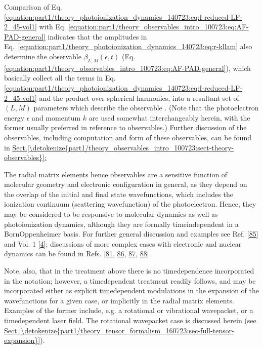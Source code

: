 \documentclass[letterpaper,table,10pt,english]{jupyterBook}
\begin{document}
\sphinxAtStartPar
Comparison of Eq. \eqref{equation:part1/theory_photoionization_dynamics_140723:eq:I-reduced-LF-2_45-vol1} with Eq. \eqref{equation:part1/theory_observables_intro_100723:eq:AF-PAD-general} indicates that the amplitudes
in Eq. \eqref{equation:part1/theory_photoionization_dynamics_140723:eq:r-kllam} also determine the observable {\hyperref[\detokenize{backmatter/glossary:term-anisotropy-paramters}]{}} \(\beta_{L,M}(\epsilon,t)\) (Eq.
\eqref{equation:part1/theory_observables_intro_100723:eq:AF-PAD-general}), which basically collect all the terms in Eq. \eqref{equation:part1/theory_photoionization_dynamics_140723:eq:I-reduced-LF-2_45-vol1} and the product over spherical harmonics, into a resultant set of \((L,M)\) parameters which describe the observable {\hyperref[\detokenize{backmatter/glossary:term-PADs}]{}}. (Note that the photoelectron energy
\(\epsilon\) and momentum \(k\) are used somewhat interchangeably herein,
with the former usually preferred in reference to observables.) Further discussion of the observables, including computation and form of these observables, can be found in \hyperref[\detokenize{part1/theory_observables_intro_100723:sect-theory-observables}]{Sect.\@ \ref{\detokenize{part1/theory_observables_intro_100723:sect-theory-observables}}:}

\sphinxAtStartPar
The radial matrix elements \sphinxhyphen{} hence observables \sphinxhyphen{} are
a sensitive function of molecular geometry and electronic configuration
in general, as they depend on the overlap of the initial and final state wavefunctions, which includes the ionization continuum (scattering wavefunction) of the photoelectron.
Hence, they may be considered to be responsive to molecular
dynamics as well as photoionization dynamics, although they are formally time\sphinxhyphen{}independent in a
Born\sphinxhyphen{}Oppenheimer basis. For further general discussion and examples see
Ref. {[}\hyperlink{cite.backmatter/bibliography:id972}{85}{]} and  Vol. 1 {[}\hyperlink{cite.backmatter/bibliography:id676}{4}{]}; discussions of more
complex cases with electronic and nuclear dynamics can be found in Refs.
{[}\hyperlink{cite.backmatter/bibliography:id881}{81}, \hyperlink{cite.backmatter/bibliography:id511}{86}, \hyperlink{cite.backmatter/bibliography:id908}{87}, \hyperlink{cite.backmatter/bibliography:id905}{88}{]}.

\sphinxAtStartPar
Note, also, that in the treatment above there is no time\sphinxhyphen{}dependence
incorporated in the notation; however, a time\sphinxhyphen{}dependent treatment
readily follows, and may be incorporated either as explicit
time\sphinxhyphen{}dependent modulations in the expansion of the wavefunctions for a
given case, or implicitly in the radial matrix elements. Examples of the
former include, e.g. a rotational or vibrational wavepacket, or a
time\sphinxhyphen{}dependent laser field. The rotational wavepacket case is discussed
herein (see \hyperref[\detokenize{part1/theory_tensor_formalism_160723:sec-full-tensor-expansion}]{Sect.\@ \ref{\detokenize{part1/theory_tensor_formalism_160723:sec-full-tensor-expansion}}}).
\end{document}
